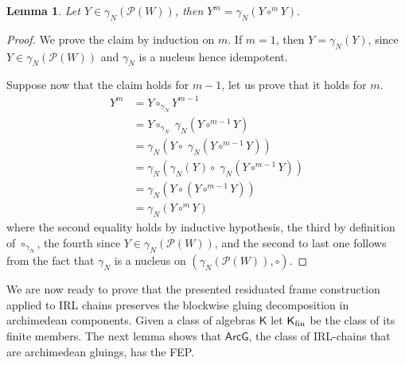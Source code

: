 \documentclass{amsart}
\newtheorem{lemma}[theorem]{Lemma}
\theoremstyle{definition}
\numberwithin{equation}{section}
\newcommand{\vv}[1]{\mathsf {#1}}
\newcommand{\BlockG}{\vv{ArcG}}
\begin{document}
 \begin{lemma}\label{lemma: powers of sets}
Let $Y \in \gamma_N(\mathcal{P}(W))$, then $Y^m=\gamma_N(Y \circ^m Y)$.
\end{lemma}
\begin{proof}
	We prove the claim by induction on $m$. If $m =1$, then $Y = \gamma_N(Y)$, since $Y \in \gamma_N(\mathcal{P}(W))$ and $\gamma_N$ is a nucleus hence idempotent. 
	
	Suppose now that the claim holds for $m-1$, let us prove that it holds for $m$. 
	\begin{align*}
	Y^m &= Y \circ_{\gamma_N} Y^{m-1}\\
	&=Y \circ_{\gamma_N} \; \gamma_N(Y \circ^{m-1}Y)\\
	&= \gamma_N(Y \circ \; \gamma_N(Y \circ^{m-1}Y))\\
	&= \gamma_N (\gamma_N(Y) \circ \;\gamma_N(Y \circ^{m-1}Y))\\
	&=\gamma_N(Y \circ (Y \circ^{m-1} Y))\\
	&= \gamma_N(Y \circ^{m}Y)
	\end{align*}
	where the second equality holds by inductive hypothesis, the third by definition of $\circ_{\gamma_N}$, the fourth since $Y \in \gamma_N(\mathcal{P}(W))$, and the second to last one follows from the fact that $\gamma_N$ is a nucleus on $(\gamma_N(\mathcal{P}(W)), \circ)$. 
\end{proof}

We are now ready to prove that the presented residuated frame construction applied to IRL chains preserves the blockwise gluing decomposition in archimedean components. 
Given a class of algebras $\vv K$ let $\vv K_{\rm fin}$ be the class of its finite members. 
The next lemma shows that $\BlockG$, the class of IRL-chains that are archimedean gluings, has the FEP.
\end{document}
